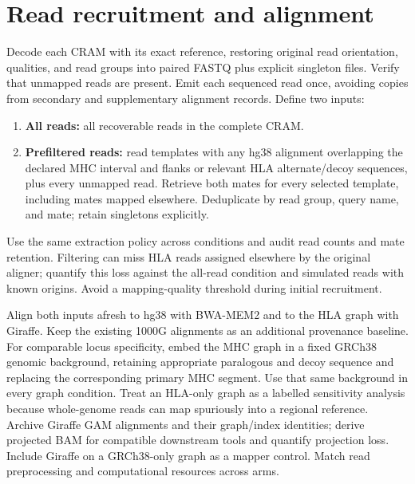 \documentclass[10pt,a4paper]{article}
\begin{document}
\section{Read recruitment and alignment}
Decode each CRAM with its exact reference, restoring original read orientation,
qualities, and read groups into paired FASTQ plus explicit singleton files.
Verify that unmapped reads are present. Emit each sequenced read once, avoiding
copies from secondary and supplementary alignment records. Define two inputs:
\begin{enumerate}
\item \textbf{All reads:} all recoverable reads in the complete CRAM.
\item \textbf{Prefiltered reads:} read templates with any hg38 alignment overlapping
      the declared MHC interval and flanks or relevant HLA alternate/decoy
      sequences, plus every unmapped read. Retrieve both mates for every selected
      template, including mates mapped elsewhere. Deduplicate by read group,
      query name, and mate; retain singletons explicitly.
\end{enumerate}
Use the same extraction policy across conditions and audit read counts and mate
retention. Filtering can miss HLA reads assigned elsewhere by the original
aligner; quantify this loss against the all-read condition and simulated reads
with known origins. Avoid a mapping-quality threshold during initial recruitment.

Align both inputs afresh to hg38 with BWA-MEM2 and to the HLA graph with Giraffe.
Keep the existing 1000G alignments as an additional provenance baseline.
For comparable locus specificity, embed the MHC graph in a fixed GRCh38 genomic
background, retaining appropriate paralogous and decoy sequence and replacing
the corresponding primary MHC segment. Use that same background in every graph
condition. Treat an HLA-only graph as a labelled sensitivity analysis because
whole-genome reads can map spuriously into a regional reference. Archive
Giraffe GAM alignments and their graph/index identities; derive projected BAM
for compatible downstream tools and quantify projection loss. Include Giraffe
on a GRCh38-only graph as a mapper control. Match read preprocessing and
computational resources across arms.
\end{document}
